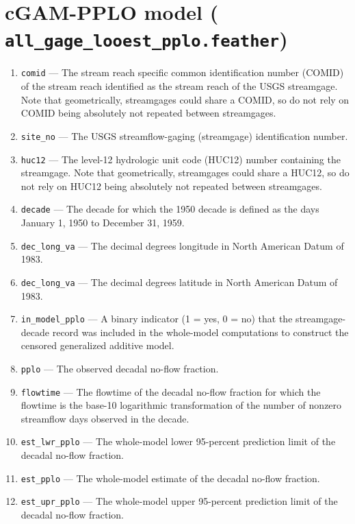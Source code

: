 \documentclass[1p, authoryear, 11pt, times, preprint]{elsarticle}
\newcommand{\code}[1]{{\color{black}%
                       \mbox{\lstinline[basicstyle={\small\ttfamily},
                                        keywordstyle=\scriptsize\ttfamily]|#1|}}}
\begin{document}
\singlespacing

\section{cGAM-PPLO model (\code{all_gage_looest_pplo.feather})}



\begin{enumerate}
\footnotesize
\RaggedRight
\item \code{comid} --- The stream reach specific common identification number (COMID) of the stream reach identified as the stream reach of the USGS streamgage. Note that geometrically, streamgages could share a COMID, so do not rely on COMID being absolutely not repeated between streamgages.
\item \code{site_no} --- The USGS streamflow-gaging (streamgage) identification number.
\item \code{huc12} --- The level-12 hydrologic unit code (HUC12) number containing the streamgage. Note that geometrically, streamgages could share a HUC12, so do not rely on HUC12 being absolutely not repeated between streamgages.
\item \code{decade} --- The decade for which the 1950 decade is defined as the days January 1, 1950 to December 31, 1959.
\item \code{dec_long_va} --- The decimal degrees longitude in North American Datum of 1983.
\item \code{dec_long_va} --- The decimal degrees latitude in North American Datum of 1983.
\item \code{in_model_pplo} --- A binary indicator (1 = yes, 0 = no) that the streamgage-decade record was included in the whole-model computations to construct the censored generalized additive model.
\item \code{pplo} --- The observed decadal no-flow fraction.
\item \code{flowtime} --- The flowtime of the decadal no-flow fraction for which the flowtime is the base-10 logarithmic transformation of the number of nonzero streamflow days observed in the decade.
\item \code{est_lwr_pplo} --- The whole-model lower 95-percent prediction limit of the decadal no-flow fraction.
\item \code{est_pplo} --- The whole-model estimate of the decadal no-flow fraction.
\item \code{est_upr_pplo} --- The whole-model upper 95-percent prediction limit of the decadal no-flow fraction.

\end{enumerate}
\end{document}
